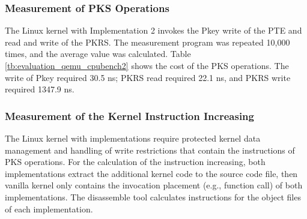 
\subsubsection{Measurement of PKS Operations}

The Linux kernel with Implementation 2 invokes the Pkey write of the PTE and
read and write of the PKRS. The measurement program was repeated 10,000 times, and
the average value was calculated.
Table \ref{tb:evaluation_qemu_cpubench2} shows the cost of the PKS operations.
The write of Pkey required 30.5 ns; PKRS read required 22.1 ns, and PKRS
write required 1347.9 ns.

%

\subsubsection{Measurement of the Kernel Instruction Increasing}
The Linux kernel with implementations require protected kernel data management
and handling of write restrictions that contain the instructions of PKS
operations.
%
%
For the calculation of the instruction increasing, both implementations extract
the additional kernel code to the source code file, then vanilla kernel only
contains the invocation placement (e.g., function call) of both implementations.
The disassemble tool calculates instructions for the object files of each
implementation.

